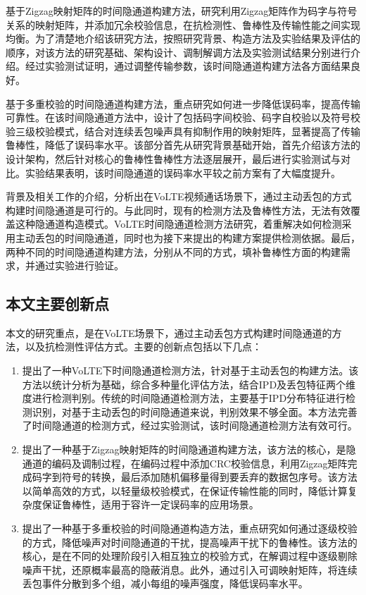 基于Zigzag映射矩阵的时间隐通道构建方法，研究利用Zigzag矩阵作为码字与符号关系的映射矩阵，并添加冗余校验信息，在抗检测性、鲁棒性及传输性能之间实现均衡。为了清楚地介绍该研究方法，按照研究背景、构造方法及实验结果及评估的顺序，对该方法的研究基础、架构设计、调制解调方法及实验测试结果分别进行介绍。经过实验测试证明，通过调整传输参数，该时间隐通道构建方法各方面结果良好。

基于多重校验的时间隐通道构建方法，重点研究如何进一步降低误码率，提高传输可靠性。在该时间隐通道方法中，设计了包括码字间校验、码字自校验以及符号校验三级校验模式，结合对连续丢包噪声具有抑制作用的映射矩阵，显著提高了传输鲁棒性，降低了误码率水平。该部分首先从研究背景基础开始，首先介绍该方法的设计架构，然后针对核心的鲁棒性鲁棒性方法逐层展开，最后进行实验测试与对比。实验结果表明，该时间隐通道的误码率水平较之前方案有了大幅度提升。

背景及相关工作的介绍，分析出在VoLTE视频通话场景下，通过主动丢包的方式构建时间隐通道是可行的。与此同时，现有的检测方法及鲁棒性方法，无法有效覆盖这种隐通道构造模式。VoLTE时间隐通道检测方法研究，着重解决如何检测采用主动丢包的时间隐通道，同时也为接下来提出的构建方案提供检测依据。最后，两种不同的时间隐通道构建方法，分别从不同的方式，填补鲁棒性方面的构建需求，并通过实验进行验证。

\subsection{本文主要创新点}
\label{sec:intro:work:inno}

本文的研究重点，是在VoLTE场景下，通过主动丢包方式构建时间隐通道的方法，以及抗检测性评估方式。主要的创新点包括以下几点：

\begin{enumerate}
    \item 提出了一种VoLTE下时间隐通道检测方法，针对基于主动丢包的构建方法。该方法以统计分析为基础，综合多种量化评估方法，结合IPD及丢包特征两个维度进行检测判别。传统的时间隐通道检测方法，主要基于IPD分布特征进行检测识别，对基于主动丢包的时间隐通道来说，判别效果不够全面。本方法完善了时间隐通道的检测方式，经过实验测试，该时间隐通道检测方法有效可行。
    \item 提出了一种基于Zigzag映射矩阵的时间隐通道构建方法，该方法的核心，是隐通道的编码及调制过程，在编码过程中添加CRC校验信息，利用Zigzag矩阵完成码字到符号的转换，最后添加随机偏移量得到要丢弃的数据包序号。该方法以简单高效的方式，以轻量级校验模式，在保证传输性能的同时，降低计算复杂度保证鲁棒性，适用于容许一定误码率的应用场景。
    \item 提出了一种基于多重校验的时间隐通道构造方法，重点研究如何通过逐级校验的方式，降低噪声对时间隐通道的干扰，提高噪声干扰下的鲁棒性。该方法的核心，是在不同的处理阶段引入相互独立的校验方式，在解调过程中逐级剔除噪声干扰，还原概率最高的隐蔽消息。此外，通过引入可调映射矩阵，将连续丢包事件分散到多个组，减小每组的噪声强度，降低误码率水平。
\end{enumerate}

